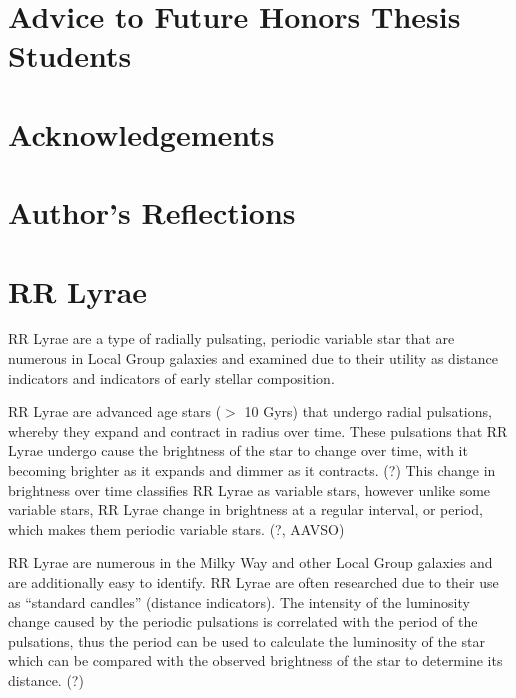 \documentclass[]{article}
\begin{document}
\newpage

\doublespacing

\tableofcontents

\newpage


\section{Advice to Future Honors Thesis Students}

\newpage

\section{Acknowledgements}

\newpage

\section{Author's Reflections}

\newpage

\section{RR Lyrae}

RR Lyrae are a type of radially pulsating, periodic variable star that are numerous in Local Group galaxies and examined due to their utility as distance indicators and indicators of early stellar composition. \cite{szczygiel_2009, kinemuchi_2006_a}

RR Lyrae are advanced age stars ($>$ 10 Gyrs) that undergo radial pulsations, whereby they expand and contract in radius over time. \cite{szczygiel_2009} These pulsations that RR Lyrae undergo cause the brightness of the star to change over time, with it becoming brighter as it expands and dimmer as it contracts. (?) This change in brightness over time classifies RR Lyrae as variable stars, however unlike some variable stars, RR Lyrae change in brightness at a regular interval, or period, which makes them periodic variable stars. (?, AAVSO)

RR Lyrae are numerous in the Milky Way and other Local Group galaxies and are additionally easy to identify. \cite{soszynski_2016, kinemuchi_2006} RR Lyrae are often researched due to their use as ``standard candles'' (distance indicators). \cite{soszynski_2016} The intensity of the luminosity change caused by the periodic pulsations is correlated with the period of the pulsations, thus the period can be used to calculate the luminosity of the star which can be compared with the observed brightness of the star to determine its distance. (?)
\end{document}
